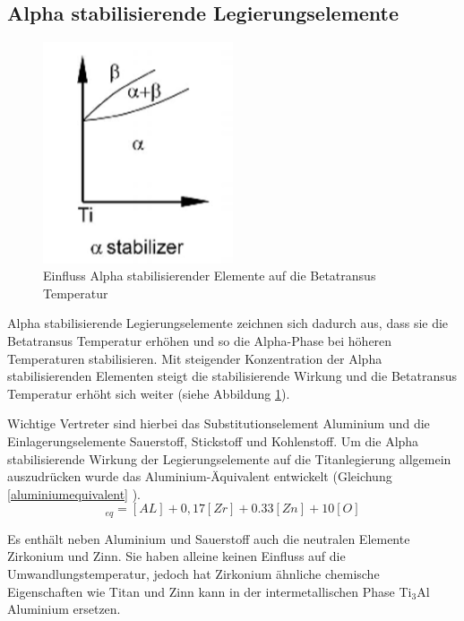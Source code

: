 \documentclass[a4paper, 11pt]{tubsreprt}
\begin{document}
\subsection{Alpha stabilisierende Legierungselemente}
\begin{figure}


\includegraphics[width=0.5\textwidth]{Bilder/alphastabilisierendelegierungselemente.png}

\caption[Einfluss Alpha stabilisierender Elemente auf die Betatransus Temperatur]{Einfluss Alpha stabilisierender Elemente auf die Betatransus Temperatur \cite{Luetjering2007}}
\label{Alpha stabilisierende Legierungselemente}
\end{figure}
Alpha stabilisierende Legierungselemente zeichnen sich dadurch aus, dass sie die Betatransus Temperatur erhöhen und so die Alpha-Phase bei höheren Temperaturen stabilisieren. Mit steigender Konzentration der Alpha stabilisierenden Elementen steigt die stabilisierende Wirkung und die Betatransus Temperatur erhöht sich weiter (siehe Abbildung \ref{Alpha stabilisierende Legierungselemente}).

Wichtige Vertreter sind hierbei das Substitutionselement Aluminium und die Einlagerungselemente Sauerstoff, Stickstoff und Kohlenstoff.
Um die Alpha stabilisierende Wirkung der Legierungselemente auf die Titanlegierung allgemein auszudrücken wurde das Aluminium-Äquivalent entwickelt (Gleichung \ref{aluminiumequivalent} \cite{Luetjering2007}).
\begin{equation}
[AL]_{eq}=[AL]+0,17[Zr]+0.33[Zn]+10[O]
\label{aluminiumequivalent}
\end{equation}

Es enthält neben Aluminium und Sauerstoff auch die neutralen Elemente Zirkonium und Zinn. Sie haben alleine keinen Einfluss auf die Umwandlungstemperatur, jedoch hat Zirkonium ähnliche chemische Eigenschaften wie Titan und Zinn kann in der intermetallischen Phase Ti$_{3}$Al Aluminium ersetzen.
\end{document}
